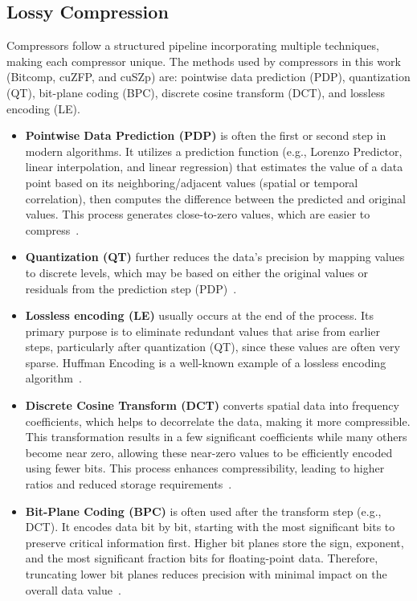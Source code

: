 \documentclass[Ingles,Final]{ic-tese-v3}
\begin{document}
\subsection{Lossy Compression}
\label{sec:lossy}

Compressors follow a structured \compression pipeline incorporating multiple techniques, making each compressor unique. The methods used by compressors in this work (Bitcomp, cuZFP, and cuSZp) are: pointwise data prediction (PDP), quantization (QT), bit-plane coding (BPC), discrete cosine transform (DCT), and lossless encoding (LE)\cite{di2025}.


\begin{itemize}
    \item \textbf{Pointwise Data Prediction (PDP)} is often the first or second step in modern \compression algorithms. It utilizes a prediction function (e.g., Lorenzo Predictor, linear interpolation, and linear regression) that estimates the value of a data point based on its neighboring/adjacent values (spatial or temporal correlation), then computes the difference between the predicted and original values. This process generates close-to-zero values, which are easier to compress~\cite{di2025,fz,cuszp}.

    \item \textbf{Quantization (QT)} further reduces the data's precision by mapping values to discrete levels, which may be based on either the original values or residuals from the prediction step (PDP)~\cite{di2025,fz}.

    \item \textbf{Lossless encoding (LE)} usually occurs at the end of the \compression process. Its primary purpose is to eliminate redundant values that arise from earlier steps, particularly after quantization (QT), since these values are often very sparse. Huffman Encoding is a well-known example of a lossless encoding algorithm~\cite{di2025}.

    \item \textbf{Discrete Cosine Transform (DCT)} converts spatial data into frequency coefficients, which helps to decorrelate the data, making it more compressible. This transformation results in a few significant coefficients while many others become near zero, allowing these near-zero values to be efficiently encoded using fewer bits. This process enhances compressibility, leading to higher \compression ratios and reduced storage requirements~\cite{di2025}.

    \item \textbf{Bit-Plane Coding (BPC)} is often used after the transform step (e.g., DCT). It encodes data bit by bit, starting with the most significant bits to preserve critical information first. Higher bit planes store the sign, exponent, and the most significant fraction bits for floating-point data. Therefore, truncating lower bit planes reduces precision with minimal impact on the overall data value~\cite{di2025}.
\end{itemize}
\end{document}
